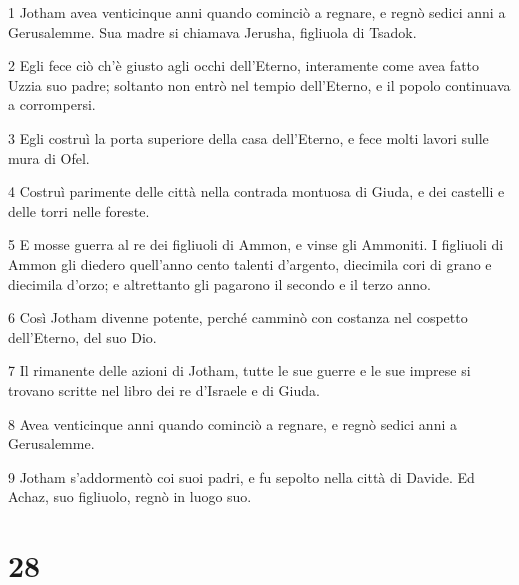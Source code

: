 \par 1 Jotham avea venticinque anni quando cominciò a regnare, e regnò sedici anni a Gerusalemme. Sua madre si chiamava Jerusha, figliuola di Tsadok.
\par 2 Egli fece ciò ch'è giusto agli occhi dell'Eterno, interamente come avea fatto Uzzia suo padre; soltanto non entrò nel tempio dell'Eterno, e il popolo continuava a corrompersi.
\par 3 Egli costruì la porta superiore della casa dell'Eterno, e fece molti lavori sulle mura di Ofel.
\par 4 Costruì parimente delle città nella contrada montuosa di Giuda, e dei castelli e delle torri nelle foreste.
\par 5 E mosse guerra al re dei figliuoli di Ammon, e vinse gli Ammoniti. I figliuoli di Ammon gli diedero quell'anno cento talenti d'argento, diecimila cori di grano e diecimila d'orzo; e altrettanto gli pagarono il secondo e il terzo anno.
\par 6 Così Jotham divenne potente, perché camminò con costanza nel cospetto dell'Eterno, del suo Dio.
\par 7 Il rimanente delle azioni di Jotham, tutte le sue guerre e le sue imprese si trovano scritte nel libro dei re d'Israele e di Giuda.
\par 8 Avea venticinque anni quando cominciò a regnare, e regnò sedici anni a Gerusalemme.
\par 9 Jotham s'addormentò coi suoi padri, e fu sepolto nella città di Davide. Ed Achaz, suo figliuolo, regnò in luogo suo.

\chapter{28}

